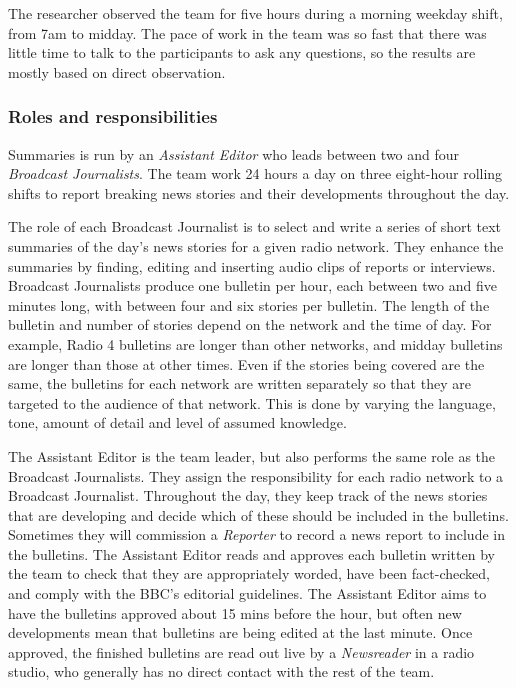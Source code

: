 The researcher observed the team for five hours during a morning weekday shift, from 7am to midday. The pace of work in
the team was so fast that there was little time to talk to the participants to ask any questions, so the results are
mostly based on direct observation.

\subsubsection{Roles and responsibilities}\label{sec:news-roles}
Summaries is run by an \textit{Assistant Editor} who leads between two and four \textit{Broadcast Journalists}. The
team work 24 hours a day on three eight-hour rolling shifts to report breaking news stories and their developments
throughout the day.

The role of each Broadcast Journalist is to select and write a series of short text summaries of the day's news stories
for a given radio network.  They enhance the summaries by finding, editing and inserting audio clips of reports or
interviews.  Broadcast Journalists produce one bulletin per hour, each between two and five minutes long, with between
four and six stories per bulletin.  The length of the bulletin and number of stories depend on the network and the time
of day. For example, Radio 4 bulletins are longer than other networks, and midday bulletins are longer than those at
other times. Even if the stories being covered are the same, the bulletins for each network are written separately so
that they are targeted to the audience of that network.  This is done by varying the language, tone, amount of detail
and level of assumed knowledge.

The Assistant Editor is the team leader, but also performs the same role as the Broadcast Journalists. They assign the
responsibility for each radio network to a Broadcast Journalist. Throughout the day, they keep track of the news
stories that are developing and decide which of these should be included in the bulletins. Sometimes they will
commission a \textit{Reporter} to record a news report to include in the bulletins. The Assistant Editor reads and
approves each bulletin written by the team to check that they are appropriately worded, have been fact-checked, and
comply with the BBC's editorial guidelines.  The Assistant Editor aims to have the bulletins approved about 15 mins
before the hour, but often new developments mean that bulletins are being edited at the last minute.  Once approved,
the finished bulletins are read out live by a \textit{Newsreader} in a radio studio, who generally has no direct
contact with the rest of the team.

